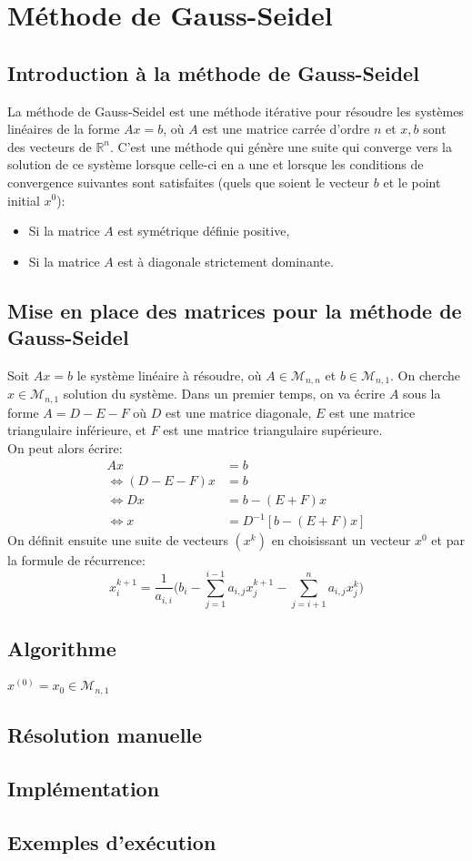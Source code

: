 \documentclass{report}
\begin{document}
\lstset{
  firstnumber=0, 
  numbers=left,               
  frame=single,
  language=C,                                       
  showstringspaces=false
}
\section{Méthode de Gauss-Seidel}
\subsection{Introduction à la méthode de Gauss-Seidel}
La méthode de Gauss-Seidel est une méthode itérative pour résoudre 
les systèmes linéaires de la forme $Ax=b$, où $A$ est une matrice carrée d'ordre $n$ et $x, b$ sont des vecteurs de $\mathbb{R}^n$. 
C'est une méthode qui génère 
une suite qui converge vers la solution de ce système lorsque celle-ci en a une et lorsque les conditions de convergence suivantes sont satisfaites (quels que soient le vecteur $b$ et le point initial $x^0$):
\begin{itemize}
  \item Si la matrice $A$ est symétrique définie positive,
  \item Si la matrice $A$ est à diagonale strictement dominante.
\end{itemize}
\subsection{Mise en place des matrices pour la méthode de Gauss-Seidel}
Soit $Ax=b$ le système linéaire à résoudre, où $A\in \mathcal{M}_{n,n}$ et $b\in  \mathcal{M}_{n,1}$. On cherche $x\in \mathcal{M}_{n,1}$ solution du système.
Dans un premier temps, on va écrire $A$ sous la forme $A=D-E-F$ où $D$ est une matrice diagonale, $E$ est une matrice triangulaire inférieure, et $F$ est une matrice triangulaire supérieure. \\
On peut alors écrire:
\begin{align}
  Ax&=b \\
  \Leftrightarrow  (D-E-F)x&=b \\
  \Leftrightarrow  Dx&=b-(E+F)x \\
  \Leftrightarrow  x&=D^{-1}[b-(E+F)x]
\end{align}
On définit ensuite une suite de vecteurs $(x^k)$ en choisissant un vecteur $x^0$ et par la formule de récurrence:\\
\begin{equation}
  x_i^{k+1}=\frac{1}{a_{i,i}}\Bigg(b_i-\sum \limits_{j = 1}^{i-1}a_{i,j}x_{j}^{k+1} - \sum \limits_{j = i+1}^{n}a_{i,j}x_{j}^{k}\Bigg)
\end{equation}
\subsection{Algorithme}

$x^{(0)}=x_0 \in \mathcal{M}_{n,1}$
\subsection{Résolution manuelle}
\subsection{Implémentation}
\subsection{Exemples d'exécution}
\end{document}
